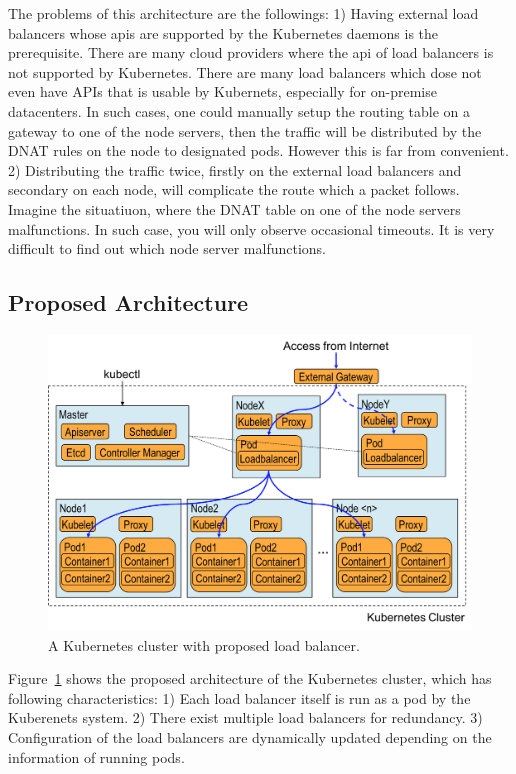 The problems of this architecture are the followings: 
1) Having external load balancers whose apis are supported by the Kubernetes daemons is the prerequisite. 
There are many cloud providers where the api of load balancers is not supported by Kubernetes. 
There are many load balancers which dose not even have APIs that is usable by Kubernets, 
especially for on-premise datacenters.  
In such cases, one could manually setup the routing table on a gateway to one of the node servers, 
then the traffic will be distributed by the DNAT rules on the node to designated pods.
However this is far from convenient.
2) Distributing the traffic twice, firstly on the external load balancers and secondary on each node, 
will complicate the route which a packet follows. 
Imagine the situatiuon, where the DNAT table on one of the node servers malfunctions.
In such case, you will only observe occasional timeouts. It is very difficult to find out which node server malfunctions.   

\subsection{Proposed Architecture}

\begin{figure}
\includegraphics[width=\columnwidth]{Figs/K8sProposed}
\caption{A Kubernetes cluster with proposed load balancer.}
\label{fig:K8sProposed}
\end{figure}

Figure~\ref{fig:K8sProposed} shows the proposed architecture of the Kubernetes cluster, 
which has following characteristics:
1) Each load balancer itself is run as a pod by the Kuberenets system. 
2) There exist multiple load balancers for redundancy. 
3) Configuration of the load balancers are dynamically updated depending on the information of running pods.


